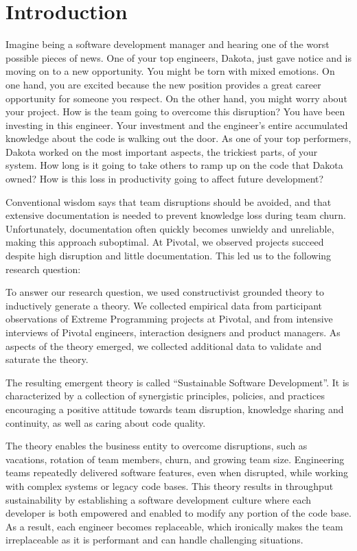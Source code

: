
\section{Introduction}

Imagine being a software development manager and hearing one of the worst possible pieces of news.  One of your top engineers, Dakota, just gave notice and is moving on to a new opportunity. You might be torn with mixed emotions. On one hand, you are excited because the new position provides a great career opportunity for someone you respect. On the other hand, you might worry about your project. How is the team going to overcome this disruption? You have been investing in this engineer. Your investment and the engineer's entire accumulated knowledge about the code is walking out the door.  As one of your top performers, Dakota worked on the most important aspects, the trickiest parts, of your system. How long is it going to take others to ramp up on the code that Dakota owned? How is this loss in productivity going to affect future development? 

Conventional wisdom says that team disruptions should be avoided, and that extensive documentation is needed to prevent knowledge loss during team churn. Unfortunately, documentation often quickly becomes unwieldy and unreliable, making this approach suboptimal. At Pivotal, we observed projects succeed despite high disruption and little documentation. This led us to the following research question: 

To answer our research question, we used constructivist grounded theory to inductively generate a theory. We collected empirical data from participant observations of Extreme Programming projects at Pivotal, and from intensive interviews of Pivotal engineers, interaction designers and product managers. As aspects of the theory emerged, we collected additional data to validate and saturate the theory.

The resulting emergent theory is called “Sustainable Software Development”. It is characterized by a collection of synergistic principles, policies, and practices encouraging a positive attitude towards team disruption, knowledge sharing and continuity, as well as caring about code quality. 

The theory enables the business entity to overcome disruptions, such as vacations, rotation of team members, churn, and growing team size. Engineering teams repeatedly delivered software features, even when disrupted, while working with complex systems or legacy code bases. This theory results in throughput sustainability by establishing a software development culture where each developer is both empowered and enabled to modify any portion of the code base. As a result, each engineer becomes replaceable, which ironically makes the team irreplaceable as it is performant and can handle challenging situations. 

